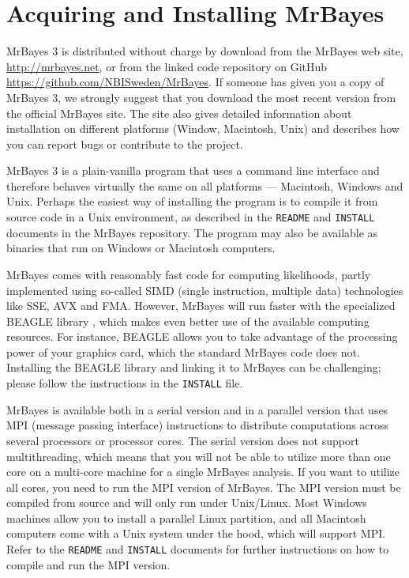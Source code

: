 \documentclass[12pt]{book}
\begin{document}
\section{Acquiring and Installing MrBayes}

MrBayes 3 is distributed without charge by download from the MrBayes web site,
\url{http://mrbayes.net}, or from the linked code repository on GitHub
\url{https://github.com/NBISweden/MrBayes}. If someone has given you a copy of MrBayes 3, we
strongly suggest that you download the most recent version from the official MrBayes site. The site
also gives detailed information about installation on different platforms (Window, Macintosh, Unix)
and describes how you can report bugs or contribute to the project.

MrBayes 3 is a plain-vanilla program that uses a command line interface and therefore behaves
virtually the same on all platforms --- Macintosh, Windows and Unix. Perhaps the easiest way of
installing the program is to compile it from source code in a Unix environment, as described in the
\texttt{README} and \texttt{INSTALL} documents in the MrBayes repository. The program may also be
available as binaries that run on Windows or Macintosh computers.

MrBayes comes with reasonably fast code for computing likelihoods, partly implemented using
so-called SIMD (single instruction, multiple data) technologies like SSE, AVX and FMA. However,
MrBayes will run faster with the specialized BEAGLE library \citep{ayres12}, which makes even
better use of the available computing resources. For instance, BEAGLE allows you to take advantage
of the processing power of your graphics card, which the standard MrBayes code does not. Installing
the BEAGLE library and linking it to MrBayes can be challenging; please follow the instructions in
the \texttt{INSTALL} file.

MrBayes is available both in a serial version and in a parallel version that uses MPI (message
passing interface) instructions to distribute computations across several processors or processor
cores. The serial version does not support multithreading, which means that you will not be able to
utilize more than one core on a multi-core machine for a single MrBayes analysis. If you want to
utilize all cores, you need to run the MPI version of MrBayes. The MPI version must be compiled
from source and will only run under Unix/Linux. Most Windows machines allow you to install a
parallel Linux partition, and all Macintosh computers come with a Unix system under the hood, which
will support MPI. Refer to the \texttt{README} and \texttt{INSTALL} documents for further
instructions on how to compile and run the MPI version.
\end{document}
